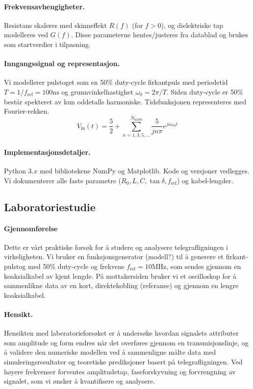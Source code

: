 \paragraph{Frekvensavhengigheter.}
Resistans skaleres med skinneffekt $R(f)$ (for $f>0$), og dielektriske tap modelleres ved
$G(f)$. Disse parameterne hentes/justeres fra datablad og brukes som startverdier i tilpasning.

\paragraph{Inngangssignal og representasjon.}
Vi modellerer pulstoget som en 50\% duty-cycle firkantpuls med periodetid $T=1/f_\mathrm{ref} = 100 \mathrm{ns}$ og grunnvinkelhastighet $\omega_0 = 2\pi / T$. Siden duty-cycle er 50\% består spekteret av kun oddetalls harmoniske. Tidsfunksjonen representeres med Fourier-rekken.
\begin{equation}
    V_{\mathrm{in}}(t) = \frac{5}{2} + \sum_{n=1,3,5,...}^{N_{\mathrm{harm}}}\frac{5}{jn\pi} e^{jn\omega_0 t}
\end{equation} 

\paragraph{Implementasjonsdetaljer.}
Python $3.x$ med bibliotekene NumPy og Matplotlib. Kode og versjoner vedlegges. Vi dokumenterer alle faste parametre ($R_0,L,C,\tan\delta,f_\mathrm{ref}$) og kabel-lengder.



\subsection{Laboratoriestudie}
\paragraph{Gjennomførelse}
Dette er vårt praktiske forsøk for å studere og analysere telegrafligningen i virkeligheten. Vi bruker en funksjonsgenerator (modell?) til å generere et firkant-pulstog med 50\% duty-cycle og frekvens $f_\mathrm{ref} = 10 \mathrm{MHz}$, som sendes gjennom en koaksialkabel av kjent lengde. På mottakersiden bruker vi et oscilloskop for å sammenlikne data av en kort, direktekobling (referanse) og gjennom en lengre koaksialkabel.
\paragraph{Hensikt.} Hensikten med laberatorieforsøket er å undersøke hvordan signalets attributer som amplitude og form endres når det overføres gjennom en transmisjonslinje, og å validere den numeriske modellen ved å sammenligne målte data med simuleringsresultater og teoretiske prediksjoner basert på telegrafligningen. Ved høyere frekvenser forventes amplitudetap, faseforskyvning og forvrengning av signalet, som vi ønsker å kvantifisere og analysere.

